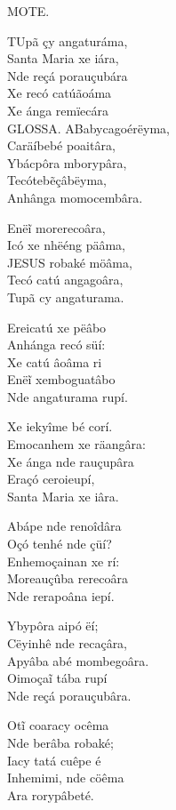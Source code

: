 \documentclass[openany,titlepage,12pt]{book}
\begin{document}
\begin{center}
    MOTE.
\end{center}
\unskip
\vspace{\baselineskip}
\lettrine[findent =4pt, nindent=0pt, lines=2]
{T}{U}pã çy angaturáma,\\
Santa Maria xe iára,\\
Nde reçá porauçubára\\
Xe recó catúãoáma\\
Xe ánga remïecára\\
GLOSSA.%
\lettrine[findent =4pt, nindent=0pt, lines=2]
{A}{B}abycagoérëyma,\\
Caräíbebé poaitâra,\\
Ybácpôra mborypâra,\\
Tecótebẽçâbëyma,\\
Anhânga momocembâra.

Enëĩ morerecoâra,\\
Icó xe nhëéng päâma,\\
JESUS robaké möâma,\\
Tecó catú angagoâra,\\
Tupã cy angaturama.

Ereicatú xe pëâbo\\
Anhánga recó süí:\\
Xe catú âoâma ri\\
Enëĩ xemboguatâbo\\
Nde angaturama rupí.

Xe iekyîme bé corí.\\
Emocanhem xe räangâra:\\
Xe ánga nde rauçupâra\\
Eraçó ceroieupí,\\
Santa Maria xe iâra.

Abápe nde renoîdâra\\
Oçó tenhé nde çüí?\\
Enhemoçainan xe rí:\\
Moreauçûba rerecoâra\\
Nde rerapoâna iepí.%

Ybypôra aipó ëí;\\
Cëyinhê nde recaçâra,\\
Apyâba abé mombegoâra.\\
Oimoçaĩ tába rupí\\
Nde reçá porauçubâra.

Otĩ coaracy ocêma\\
Nde berâba robaké;\\
Iacy tatá cuêpe é\\
Inhemimi, nde cöêma\\
Ara rorypâbeté.
\end{document}

